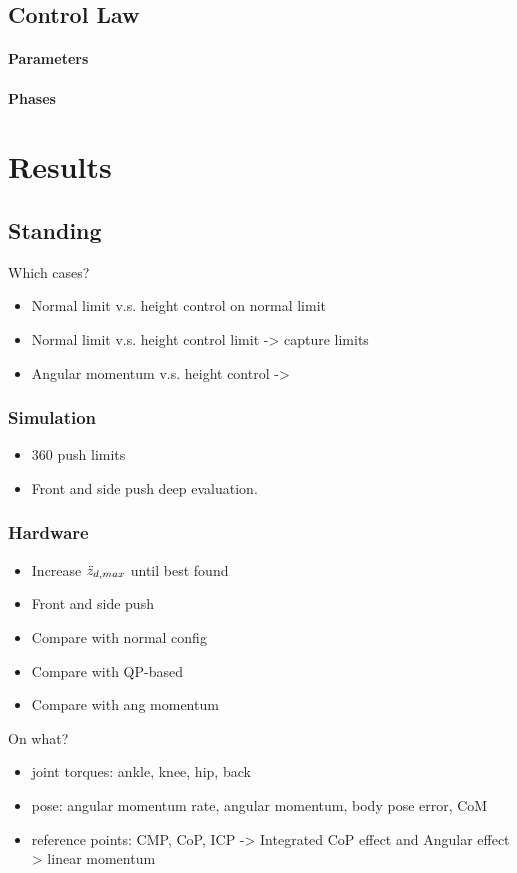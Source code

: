 \subsection{Control Law}
\paragraph{Parameters}
\paragraph{Phases}


\clearpage
\section{Results}
\subsection{Standing}
Which cases?
\begin{itemize}
	\item Normal limit v.s. height control on normal limit
	\item Normal limit v.s. height control limit -> capture limits
	\item Angular momentum v.s. height control -> 
\end{itemize}
\subsubsection{Simulation}
\begin{itemize}
	\item 360 push limits
	\item Front and side push deep evaluation.
\end{itemize}
\subsubsection{Hardware}
\begin{itemize}
	\item Increase $\ddot{z}_{d,max}$ until best found
	\item Front and side push
	\item Compare with normal config
	\item Compare with QP-based
	\item Compare with ang momentum
\end{itemize}
On what?
\begin{itemize}
	\item joint torques: ankle, knee, hip, back
	\item pose: angular momentum rate, angular momentum, body pose error, CoM
	\item reference points: CMP, CoP, ICP -> Integrated CoP effect and Angular effect > linear momentum
\end{itemize}

